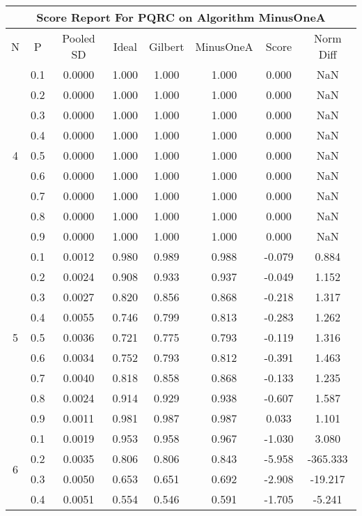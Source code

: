 \documentclass[11pt,a4paper]{report}
\begin{document}
\begin{longtable}{ | c | c || c | c | c | c | c | c | }
\hline
\multicolumn{8}{|c|}{ Score Report For PQRC on Algorithm MinusOneA} \\
\hline
N & P & Pooled SD &  Ideal &  Gilbert & MinusOneA  & Score & Norm Diff \\
 \hline
 \hline
 \endhead
\multirow{9}{*}{4} & 0.1 & 0.0000 & 1.000 & 1.000 & 1.000 & 0.000 & NaN \\
 & 0.2 & 0.0000 & 1.000 & 1.000 & 1.000 & 0.000 & NaN \\
 & 0.3 & 0.0000 & 1.000 & 1.000 & 1.000 & 0.000 & NaN \\
 & 0.4 & 0.0000 & 1.000 & 1.000 & 1.000 & 0.000 & NaN \\
 & 0.5 & 0.0000 & 1.000 & 1.000 & 1.000 & 0.000 & NaN \\
 & 0.6 & 0.0000 & 1.000 & 1.000 & 1.000 & 0.000 & NaN \\
 & 0.7 & 0.0000 & 1.000 & 1.000 & 1.000 & 0.000 & NaN \\
 & 0.8 & 0.0000 & 1.000 & 1.000 & 1.000 & 0.000 & NaN \\
 & 0.9 & 0.0000 & 1.000 & 1.000 & 1.000 & 0.000 & NaN \\
 \hline
\multirow{9}{*}{5} & 0.1 & 0.0012 & 0.980 & 0.989 & 0.988 & -0.079 & 0.884 \\
 & 0.2 & 0.0024 & 0.908 & 0.933 & 0.937 & -0.049 & 1.152 \\
 & 0.3 & 0.0027 & 0.820 & 0.856 & 0.868 & -0.218 & 1.317 \\
 & 0.4 & 0.0055 & 0.746 & 0.799 & 0.813 & -0.283 & 1.262 \\
 & 0.5 & 0.0036 & 0.721 & 0.775 & 0.793 & -0.119 & 1.316 \\
 & 0.6 & 0.0034 & 0.752 & 0.793 & 0.812 & -0.391 & 1.463 \\
 & 0.7 & 0.0040 & 0.818 & 0.858 & 0.868 & -0.133 & 1.235 \\
 & 0.8 & 0.0024 & 0.914 & 0.929 & 0.938 & -0.607 & 1.587 \\
 & 0.9 & 0.0011 & 0.981 & 0.987 & 0.987 & 0.033 & 1.101 \\
 \hline
\multirow{9}{*}{6} & 0.1 & 0.0019 & 0.953 & 0.958 & 0.967 & -1.030 & 3.080 \\
 & 0.2 & 0.0035 & 0.806 & 0.806 & 0.843 & -5.958 & -365.333 \\
 & 0.3 & 0.0050 & 0.653 & 0.651 & 0.692 & -2.908 & -19.217 \\
 & 0.4 & 0.0051 & 0.554 & 0.546 & 0.591 & -1.705 & -5.241 \\

\end{longtable}
\end{document}
